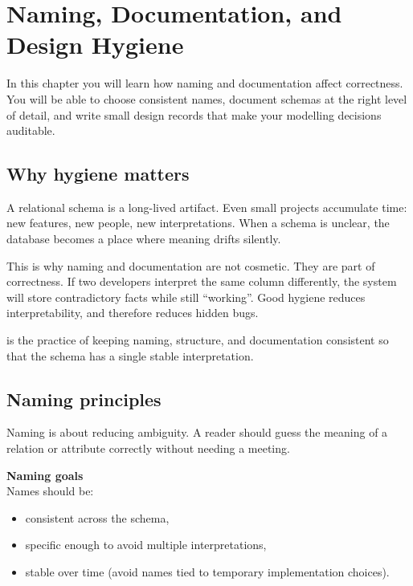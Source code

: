 \chapter{Naming, Documentation, and Design Hygiene}

\begin{learningobjectives}
In this chapter you will learn how naming and documentation affect correctness.
You will be able to choose consistent names, document schemas at the right level of detail, and write small design records that make your modelling decisions auditable.
\end{learningobjectives}

\section{Why hygiene matters}
A relational schema is a long-lived artifact.
Even small projects accumulate time: new features, new people, new interpretations.
When a schema is unclear, the database becomes a place where meaning drifts silently.

This is why naming and documentation are not cosmetic.
They are part of correctness.
If two developers interpret the same column differently, the system will store contradictory facts while still “working”.
Good hygiene reduces interpretability, and therefore reduces hidden bugs.

\begin{definitionbox}
 is the practice of keeping naming, structure, and documentation consistent so that the schema has a single stable interpretation.
\end{definitionbox}

\section{Naming principles}
Naming is about reducing ambiguity.
A reader should guess the meaning of a relation or attribute correctly without needing a meeting.

\begin{principlebox}
\textbf{Naming goals}\\[2pt]
Names should be:
\begin{itemize}[leftmargin=*,nosep]
  \item consistent across the schema,
  \item specific enough to avoid multiple interpretations,
  \item stable over time (avoid names tied to temporary implementation choices).
\end{itemize}
\end{principlebox}

